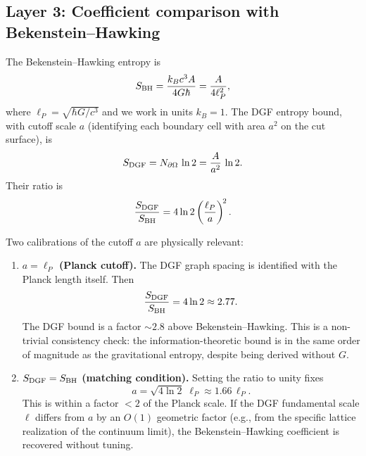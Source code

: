 \documentclass[aps,prd,twocolumn,superscriptaddress,nofootinbib,floatfix]{revtex4-2}
\begin{document}
\subsection{Layer 3: Coefficient comparison with Bekenstein--Hawking}
\label{sec:S4_coefficient}

The Bekenstein--Hawking entropy is
\begin{equation}
  S_{\rm BH} = \frac{k_B c^3 A}{4G\hbar}
             = \frac{A}{4\ell_P^2},
  \label{eq:S4_SBH}
\end{equation}
where $\ell_P = \sqrt{\hbar G/c^3}$ and we work in units $k_B=1$.
The DGF entropy bound, with cutoff scale $a$ (identifying each boundary cell
with area $a^2$ on the cut surface), is
\begin{equation}
  S_{\rm DGF} = N_{\partial\Omega}\,\ln 2
              = \frac{A}{a^2}\,\ln 2.
  \label{eq:S4_SDGF}
\end{equation}
Their ratio is
\begin{equation}
  \frac{S_{\rm DGF}}{S_{\rm BH}}
  = 4\ln 2\left(\frac{\ell_P}{a}\right)^{\!2}.
  \label{eq:S4_ratio}
\end{equation}

Two calibrations of the cutoff $a$ are physically relevant:

\begin{enumerate}
  \item \textbf{$a = \ell_P$ (Planck cutoff).}
    The DGF graph spacing is identified with the Planck length itself.
    Then
    \begin{equation}
      \frac{S_{\rm DGF}}{S_{\rm BH}} = 4\ln 2 \approx 2.77.
      \label{eq:S4_ratio1}
    \end{equation}
    The DGF bound is a factor $\sim 2.8$ above Bekenstein--Hawking.
    This is a non-trivial consistency check: the information-theoretic
    bound is in the same order of magnitude as the gravitational entropy,
    despite being derived without $G$.

  \item \textbf{$S_{\rm DGF}=S_{\rm BH}$ (matching condition).}
    Setting the ratio to unity fixes
    \begin{equation}
      a = \sqrt{4\ln 2}\; \ell_P \approx 1.66\,\ell_P.
      \label{eq:S4_matching}
    \end{equation}
    This is within a factor $<2$ of the Planck scale.  If the DGF
    fundamental scale $\ell$ differs from $a$ by an $O(1)$ geometric
    factor (e.g., from the specific lattice realization of the continuum
    limit), the Bekenstein--Hawking coefficient is recovered without
    tuning.
\end{enumerate}
\end{document}
